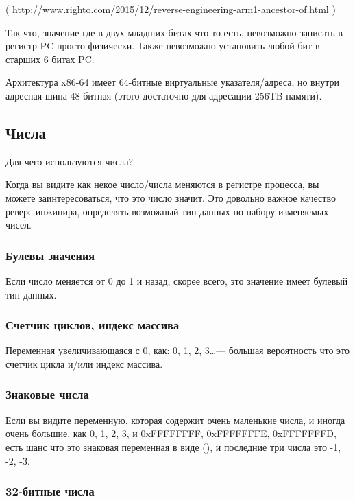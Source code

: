 ( \url{http://www.righto.com/2015/12/reverse-engineering-arm1-ancestor-of.html} )

Так что, значение где в двух младших битах что-то есть, невозможно записать в регистр PC просто физически.
Также невозможно установить любой бит в старших 6 битах PC.

Архитектура x86-64 имеет 64-битные виртуальные указателя/адреса, но внутри адресная шина 48-битная
(этого достаточно для адресации 256TB памяти).

\subsection{Числа}

Для чего используются числа?

Когда вы видите как некое число/числа меняются в регистре процесса, вы можете заинтересоваться, что это число значит.
Это довольно важное качество реверс-инжинира, определять возможный тип данных по набору изменяемых чисел.

\subsubsection{Булевы значения}

Если число меняется от 0 до 1 и назад, скорее всего, это значение имеет булевый тип данных.

\subsubsection{Счетчик циклов, индекс массива}

Переменная увеличивающаяся с 0, как: 0, 1, 2, 3\dots --- большая вероятность что это счетчик цикла и/или индекс массива.

\subsubsection{Знаковые числа}

Если вы видите переменную, которая содержит очень маленькие числа, и иногда очень большие,
как 0, 1, 2, 3, и 0xFFFFFFFF, 0xFFFFFFFE, 0xFFFFFFFD,
есть шанс что это знаковая переменная в виде  (),
и последние три числа это -1, -2, -3.

\subsubsection{32-битные числа}

